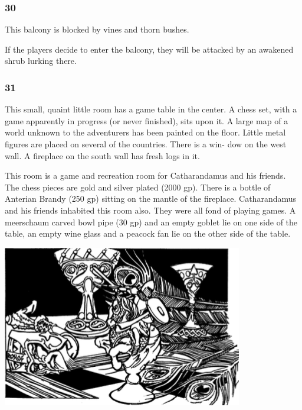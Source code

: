 \documentclass[palace_of_the_silver_princess]{subfiles}
\begin{document}
\subsubsection{30}
\begin{quotebox}
    This balcony is blocked by vines and thorn bushes.
\end{quotebox}

If the players decide to enter the balcony, they will be attacked by an
awakened shrub lurking there.

\subsubsection{31}
\begin{quotebox}
    This small, quaint little room has a game table in the center. A
    chess set, with a game apparently in progress (or never finished),
    sits upon it. A large map of a world unknown to the adventurers has
    been painted on the floor. Little metal figures are placed on
    several of the countries. There is a win- dow on the west wall. A
    fireplace on the south wall has fresh logs in it.
\end{quotebox}

This room is a game and recreation room for Catharandamus and his
friends. The chess pieces are gold and silver plated (2000 gp). There is
a bottle of Anterian Brandy (250 gp) sitting on the mantle of the
fireplace. Catharandamus and his friends inhabited this room also. They
were all fond of playing games. A meerschaum carved bowl pipe (30 gp)
and an empty goblet lie on one side of the table, an empty wine glass
and a peacock fan lie on the other side of the table.

\includegraphics[width=\columnwidth]{img/goblet.png}
\end{document}

